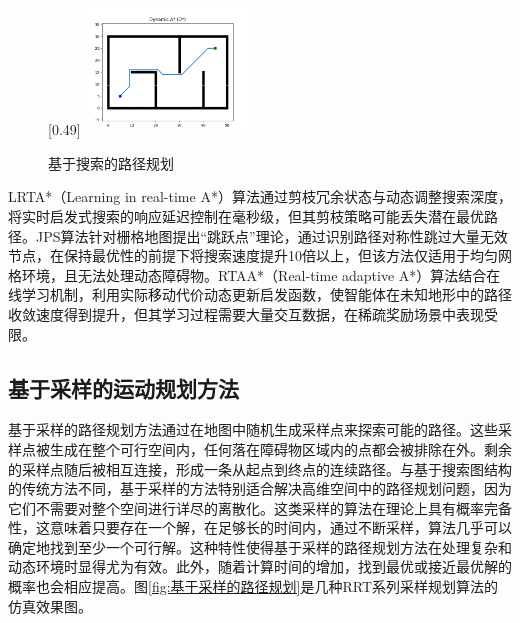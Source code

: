 \documentclass[master,academic]{ysuthesis} %
\begin{document}
\begin{figure}[!ht]
			[0.49\textwidth]{\includegraphics[width=0.4\textwidth]{fig/插图/A-search/Dstar.png}}
			\caption{基于搜索的路径规划}
			\label{fig:基于搜索的路径规划}
		\end{figure}

		LRTA*（Learning in real-time A*）算法\cite{bulitko2006learning}通过剪枝冗余状态与动态调整搜索深度，将实时启发式搜索的响应延迟控制在毫秒级，但其剪枝策略可能丢失潜在最优路径。JPS算法\cite{harabor2011online}针对栅格地图提出“跳跃点”理论，通过识别路径对称性跳过大量无效节点，在保持最优性的前提下将搜索速度提升10倍以上，但该方法仅适用于均匀网格环境，且无法处理动态障碍物。RTAA*（Real-time adaptive A*）算法\cite{koenig2006real}结合在线学习机制，利用实际移动代价动态更新启发函数，使智能体在未知地形中的路径收敛速度得到提升，但其学习过程需要大量交互数据，在稀疏奖励场景中表现受限。

		\subsection{基于采样的运动规划方法}
		基于采样的路径规划方法通过在地图中随机生成采样点来探索可能的路径。这些采样点被生成在整个可行空间内，任何落在障碍物区域内的点都会被排除在外。剩余的采样点随后被相互连接，形成一条从起点到终点的连续路径。与基于搜索图结构的传统方法不同，基于采样的方法特别适合解决高维空间中的路径规划问题，因为它们不需要对整个空间进行详尽的离散化。这类采样的算法在理论上具有概率完备性，这意味着只要存在一个解，在足够长的时间内，通过不断采样，算法几乎可以确定地找到至少一个可行解。这种特性使得基于采样的路径规划方法在处理复杂和动态环境时显得尤为有效。此外，随着计算时间的增加，找到最优或接近最优解的概率也会相应提高。图\ref{fig:基于采样的路径规划}是几种RRT系列采样规划算法的仿真效果图。
\end{document}
